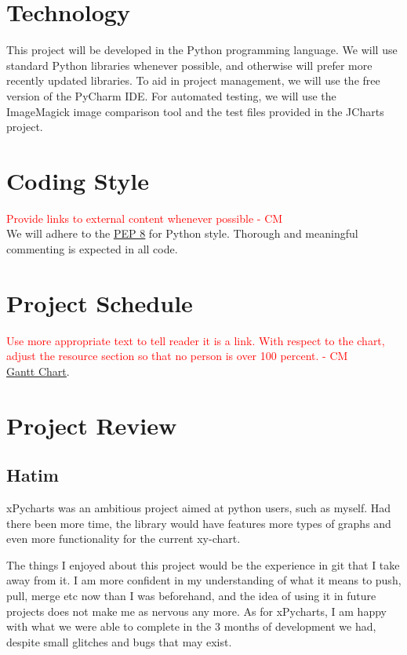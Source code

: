 \documentclass{article}
\begin{document}
\section{Technology} %
This project will be developed in the Python programming language. We will use standard Python libraries whenever possible, and otherwise will prefer more recently updated libraries. To aid in project management, we will use the free version of the PyCharm IDE.  For automated testing, we will use the ImageMagick image comparison tool and the test files provided in the JCharts project.

\section{Coding Style} %

\textcolor{red}{Provide links to external content whenever possible  - CM} \\
We will adhere to the \href{https://www.python.org/dev/peps/pep-0008/}{\underline{PEP 8}} for Python style. Thorough and meaningful commenting is expected in all code.

\section{Project Schedule}


\textcolor{red}{Use more appropriate text to tell reader it is a link. With respect to the chart, adjust the resource section so that no person is over 100 percent. - CM} \\
 \href{run:../DevelopmentPlan/GanttChart.gan} {\underline{Gantt Chart}}.

\section{Project Review} 
\subsection{Hatim}
xPycharts was an ambitious project aimed at python users, such as myself. Had there been more time, the library would have features more types of graphs and even more functionality for the current xy-chart. 

The things I enjoyed about this project would be the experience in git that I take away from it. I am more confident in my understanding of what it means to push, pull, merge etc now than I was beforehand, and the idea of using it in future projects does not make me as nervous any more. As for xPycharts, I am happy with what we were able to complete in the 3 months of development we had, despite small glitches and bugs that may exist. 
\end{document}

